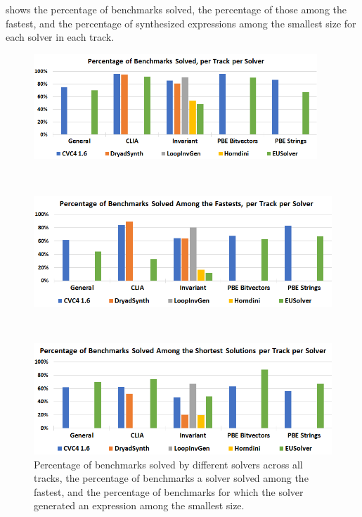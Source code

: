  shows the percentage of benchmarks solved,
the percentage of those among the fastest,
and the percentage of synthesized expressions among the smallest size
for each solver in each track.

\begin{figure}
	\begin{center}
		\begin{minipage}{\textwidth}
			\centering
			\includegraphics[width=0.95\textwidth]{figures/Solved.png}
		\end{minipage}
		\\[1cm]
		\begin{minipage}{\textwidth}
			\centering
			\includegraphics[width=\textwidth]{figures/Fastest.png}
		\end{minipage}
		\\[1cm]
		\begin{minipage}{\textwidth}
			\centering
			\includegraphics[width=\textwidth]{figures/Smallest.png}
		\end{minipage}
	\end{center}
	\caption{Percentage of benchmarks solved by different solvers across all tracks,
			 the percentage of benchmarks a solver solved among the fastest,
			 and the percentage of benchmarks for which the solver generated an expression among the smallest size.}
	\label{fig:resultsPerTrack}	
\end{figure}

